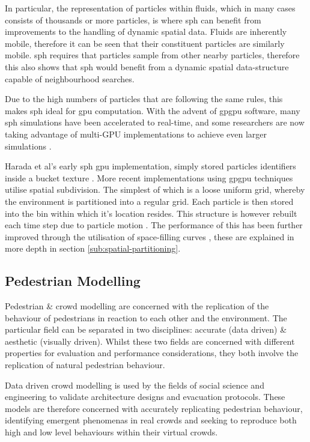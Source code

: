     In particular, the representation of particles within fluids, which in many cases consists of thousands or more particles, is where \gls{sph} can benefit from improvements to the handling of dynamic spatial data. Fluids are inherently mobile, therefore it can be seen that their constituent particles are similarly mobile. \gls{sph} requires that particles sample from other nearby particles, therefore this also shows that \gls{sph} would benefit from a dynamic spatial data-structure capable of neighbourhood searches. 
    
    Due to the high numbers of particles that are following the same rules, this makes \gls{sph} ideal for \gls{gpu} computation. With the advent of \gls{gpgpu} software, many \gls{sph} simulations have been accelerated to real-time, and some researchers are now taking advantage of multi-GPU implementations to achieve even larger simulations \cite{DC*13}.
    
    Harada et al's early \gls{sph} \gls{gpu} implementation, simply stored particles identifiers inside a bucket texture \cite{hkk07}. More recent implementations using \gls{gpgpu} techniques utilise spatial subdivision. The simplest of which is a loose uniform grid, whereby the environment is partitioned into a regular grid. Each particle is then stored into the bin within which it's location resides. This structure is however rebuilt each time step due to particle motion \cite{Gre10}. The performance of this has been further improved through the utilisation of space-filling curves \cite{GS*10}, these are explained in more depth in section \ref{sub:spatial-partitioning}.
  
  \subsection{Pedestrian Modelling\label{sub:ped-modelling}}
    Pedestrian \& crowd modelling are concerned with the replication of the behaviour of pedestrians in reaction to each other and the environment. The particular field can be separated in two disciplines: accurate (data driven) \& aesthetic (visually driven). Whilst these two fields are concerned with different properties for evaluation and performance considerations, they both involve the replication of natural pedestrian behaviour.
    
    Data driven crowd modelling is used by the fields of social science and engineering to validate architecture designs and evacuation protocols. These models are therefore concerned with accurately replicating pedestrian behaviour, identifying emergent phenomenas in real crowds and seeking to reproduce both high and low level behaviours within their virtual crowds.
    
